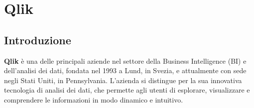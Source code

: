 
\chapter{Qlik}

\section{Introduzione}

\textbf{Qlik} è una delle principali aziende nel settore della Business Intelligence (BI) e dell'analisi dei dati, fondata nel 1993 a Lund, in Svezia, e attualmente con sede negli Stati Uniti, in Pennsylvania. L'azienda si distingue per la sua innovativa tecnologia di analisi dei dati, che permette agli utenti di esplorare, visualizzare e comprendere le informazioni in modo dinamico e intuitivo.

